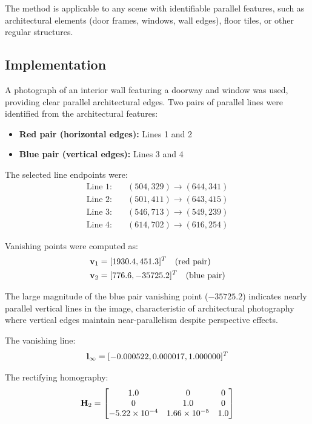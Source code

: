 The method is applicable to any scene with identifiable parallel features, such as architectural elements (door frames, windows, wall edges), floor tiles, or other regular structures.

\subsection{Implementation}
A photograph of an interior wall featuring a doorway and window was used, providing clear parallel architectural edges. Two pairs of parallel lines were identified from the architectural features:
\begin{itemize}
    \item \textbf{Red pair (horizontal edges):} Lines 1 and 2
    \item \textbf{Blue pair (vertical edges):} Lines 3 and 4
\end{itemize}

The selected line endpoints were:
\begin{align*}
    \text{Line 1:} &\quad (504, 329) \to (644, 341) \\
    \text{Line 2:} &\quad (501, 411) \to (643, 415) \\
    \text{Line 3:} &\quad (546, 713) \to (549, 239) \\
    \text{Line 4:} &\quad (614, 702) \to (616, 254)
\end{align*}

Vanishing points were computed as:
\begin{align*}
    \mathbf{v}_1 &= [1930.4, 451.3]^T \quad \text{(red pair)} \\
    \mathbf{v}_2 &= [776.6, -35725.2]^T \quad \text{(blue pair)}
\end{align*}

The large magnitude of the blue pair vanishing point ($-35725.2$) indicates nearly parallel vertical lines in the image, characteristic of architectural photography where vertical edges maintain near-parallelism despite perspective effects.

The vanishing line:
\begin{equation}
    \mathbf{l}_\infty = [-0.000522, 0.000017, 1.000000]^T
\end{equation}

The rectifying homography:
\begin{equation}
    \mathbf{H}_2 = \begin{bmatrix} 
    1.0 & 0 & 0 \\
    0 & 1.0 & 0 \\
    -5.22 \times 10^{-4} & 1.66 \times 10^{-5} & 1.0
    \end{bmatrix}
\end{equation}


